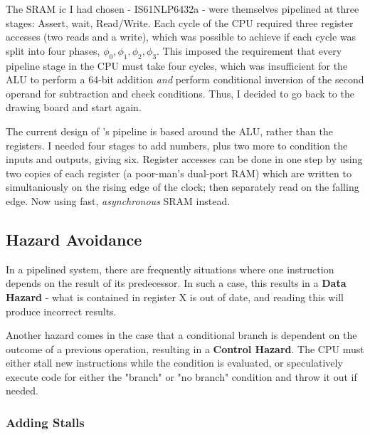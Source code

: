\documentclass[a4paper, 11pt]{article}
\begin{document}
            The SRAM ic I had chosen - IS61NLP6432a \cite{IS61NLP6432a} - were
            themselves pipelined at three stages: 
            Assert, wait, Read/Write.
            Each cycle of the CPU required three register accesses
            (two reads and a write), which was possible to achieve if each
            cycle was split into four phases, $\phi_{0}, \phi_{1}, \phi_{2},
            \phi_{3}$. 
            This imposed the requirement that every pipeline stage in the CPU 
            must take four cycles, which was insufficient for the ALU to 
            perform a 64-bit addition \emph{and} perform conditional inversion 
            of the second operand for subtraction and check conditions. 
            Thus, I decided to go back to the drawing board and start again.

            The current design of \logo's pipeline is based around the ALU,
            rather than the registers. 
            I needed four stages to add numbers, plus two more to condition the 
            inputs and outputs, giving six.
            Register accesses can be done in one step by using two copies
            of each register (a poor-man's dual-port RAM) which are written
            to simultaniously on the rising edge of the clock; then
            separately read on the falling edge. Now using fast,
            \emph{asynchronous} SRAM instead.

        \subsection{Hazard Avoidance}\label{sec:Intro:HazAvoid}

            In a pipelined system, there are frequently situations where one
            instruction depends on the result of its predecessor. 
            In such a case, this results in a \textbf{Data Hazard} - what 
            is contained in register X is out of date, and reading this will 
            produce incorrect results.

            Another hazard comes in the case that a conditional branch is dependent
            on the outcome of a previous operation, resulting in a
            \textbf{Control Hazard}. 
            The CPU must either stall new instructions while the condition is 
            evaluated, or speculatively execute code for either the "branch" 
            or "no branch" condition and throw it out if needed.

            \subsubsection{Adding Stalls}\label{sec:Intro:HazAvoid:Stalls}
\end{document}
